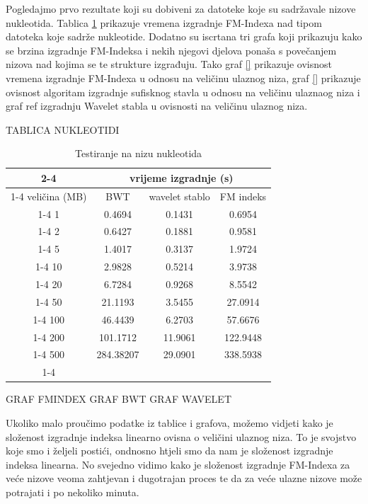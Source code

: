Pogledajmo prvo rezultate koji su dobiveni za datoteke koje su sadržavale nizove nukleotida. Tablica \ref{tbl:tablNukleotidi} prikazuje vremena izgradnje FM-Indexa nad tipom datoteka koje sadrže nukleotide. Dodatno su iscrtana tri grafa koji prikazuju kako se brzina izgradnje FM-Indeksa i nekih njegovi djelova ponaša s povečanjem nizova nad kojima se te strukture izgrađuju. Tako graf \ref{} prikazuje ovisnost vremena izgradnje FM-Indexa u odnosu na veličinu ulaznog niza, graf \ref{} prikazuje ovisnost algoritam izgradnje sufisknog stavla u odnosu na veličinu ulaznaog niza i graf ref{} izgradnju Wavelet stabla u ovisnosti na veličinu ulaznog niza.

TABLICA NUKLEOTIDI

\begin{table}[h]
\caption{Testiranje na nizu nukleotida}
\label{tbl:tablNukleotidi}
\centering
\begin{tabular}{c|c|c|c|}
\cline{2-4}
      	    					 & \multicolumn{3}{c|}{vrijeme izgradnje (s)}  \\ \cline{1-4}
\multicolumn{1}{ |c| } {veličina (MB)} & BWT & wavelet stablo & FM indeks  \\ \cline{1-4}  
\multicolumn{1}{ |c| } {   1    } 		& 	0.4694	&	0.1431	&	0.6954	\\ \cline{1-4}
\multicolumn{1}{ |c| } {   2    } 		& 	0.6427	&	0.1881	&	0.9581	\\ \cline{1-4}
\multicolumn{1}{ |c| } {   5    } 		&	1.4017	&	0.3137	&	1.9724	\\ \cline{1-4}
\multicolumn{1}{ |c| } {   10    } 	&	2.9828	&	0.5214	&	3.9738	\\ \cline{1-4}
\multicolumn{1}{ |c| } {   20    } 	&	6.7284	&	0.9268	&	8.5542	\\ \cline{1-4}
\multicolumn{1}{ |c| } {   50    } 	&	21.1193	&	3.5455	&	27.0914	\\ \cline{1-4}
\multicolumn{1}{ |c| } {   100    } 	&	46.4439	&	6.2703	&	57.6676	\\ \cline{1-4}
\multicolumn{1}{ |c| } {   200    } 	&	101.1712	&	11.9061	&	122.9448	\\ \cline{1-4}
\multicolumn{1}{ |c| } {   500    } 	&	284.38207	&	29.0901	&	338.5938	\\ \cline{1-4}
\end{tabular}
\end{table}


GRAF FMINDEX
GRAF BWT
GRAF WAVELET


Ukoliko malo proučimo podatke iz tablice i grafova, možemo vidjeti kako je složenost izgradnje indeksa linearno ovisna o veličini ulaznog niza. To je svojstvo koje smo i željeli postići, ondnosno htjeli smo da nam je složenost izgradnje indeksa linearna. No svejedno vidimo kako je složenost izgradnje FM-Indexa za veće nizove veoma zahtjevan i dugotrajan proces te da za veće ulazne nizove može potrajati i po nekoliko minuta.

